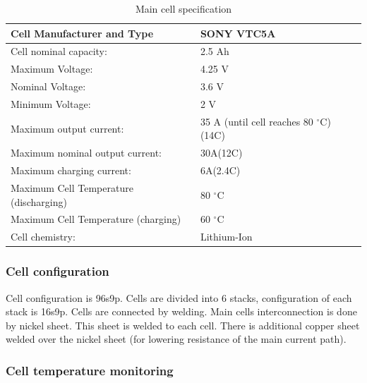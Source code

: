 \begin{table}[H]
	\centering
	\caption{Main cell specification}
	\begin{tabularx}{\textwidth}{|X|X|}
		\hline
		Cell Manufacturer and Type & SONY VTC5A \\[\TableSize]
		\hline
		Cell nominal capacity: & 2.5 Ah \\[\TableSize]
		\hline
		Maximum Voltage: & 4.25 V \\[\TableSize]
		\hline
		Nominal Voltage: & 3.6 V \\[\TableSize]
		\hline
		Minimum Voltage:  & 2 V \\[\TableSize]
		\hline
		Maximum output current: & 35 A (until cell reaches 80 $^\circ$C) (14C)\\[\TableSize]
		\hline
		Maximum nominal output current: & 30A(12C) \\[\TableSize]
		\hline
		Maximum charging current: & 6A(2.4C) \\[\TableSize]
		\hline
		Maximum Cell Temperature (discharging) & 80 $^\circ$C \\[\TableSize]
		\hline
		Maximum Cell Temperature (charging) & 60 $^\circ$C \\[\TableSize]
		\hline
		Cell chemistry: & Lithium-Ion \\[\TableSize]
		\hline
	\end{tabularx}%
	\label{tab:acc-cell}%
\end{table}%

\subsubsection{Cell configuration}

Cell configuration is 96s9p. Cells are divided into 6 stacks, configuration of each stack is 16s9p. Cells are connected by welding. Main cells interconnection is done by nickel sheet. This sheet is welded to each cell. There is additional copper sheet welded over the nickel sheet (for lowering resistance of the main current path). 
\subsubsection{Cell temperature monitoring}

